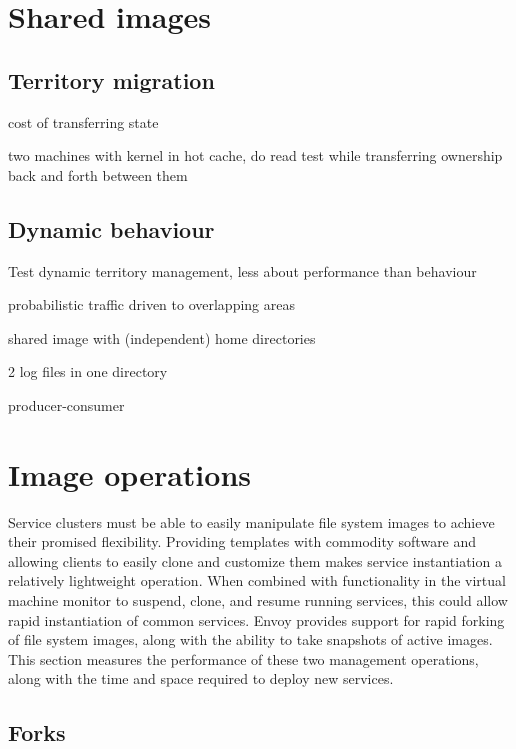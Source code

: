 \section{Shared images}\label{sec:shared-images}



\subsection{Territory migration}

cost of transferring state

two machines with kernel in hot cache, do read test while transferring ownership back and forth between them

\subsection{Dynamic behaviour}

Test dynamic territory management, less about performance than behaviour

probabilistic traffic driven to overlapping areas

shared image with (independent) home directories

2 log files in one directory

producer-consumer

\section{Image operations}\label{sec:image-operations}

Service clusters must be able to easily manipulate file system images to achieve their promised flexibility. Providing templates with commodity software and allowing clients to easily clone and customize them makes service instantiation a relatively lightweight operation. When combined with functionality in the virtual machine monitor to suspend, clone, and resume running services, this could allow rapid instantiation of common services. Envoy provides support for rapid forking of file system images, along with the ability to take snapshots of active images. This section measures the performance of these two management operations, along with the time and space required to deploy new services.

\subsection{Forks}

